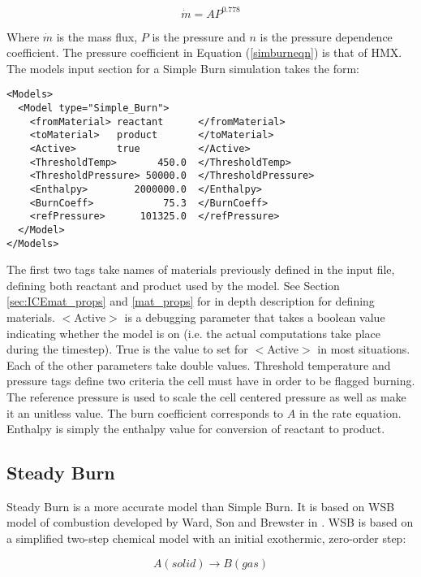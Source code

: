 \begin{equation}
\dot{m}=A P^{0.778}
\label{simburneqn}
\end{equation}

Where $\dot{m}$ is the mass flux, $P$ is the pressure and $n$ is the pressure dependence coefficient.  The pressure coefficient in Equation (\ref{simburneqn}) is that of HMX.  The models input section for a Simple Burn simulation takes the form: 

\begin{verbatim}
<Models>
  <Model type="Simple_Burn">
    <fromMaterial> reactant      </fromMaterial>
    <toMaterial>   product       </toMaterial>
    <Active>       true          </Active>
    <ThresholdTemp>       450.0  </ThresholdTemp>
    <ThresholdPressure> 50000.0  </ThresholdPressure>
    <Enthalpy>        2000000.0  </Enthalpy>
    <BurnCoeff>            75.3  </BurnCoeff>
    <refPressure>      101325.0  </refPressure>
  </Model>
</Models>
\end{verbatim}

The first two tags take names of materials previously defined in the input file, defining both reactant and product used by the model.  See Section \ref{sec:ICEmat_props} and \ref{mat_props} for in depth description for defining materials.  $<$Active$>$ is a debugging parameter that takes a boolean value indicating whether the model is on (i.e. the actual computations take place during the timestep).  True is the value to set for $<$Active$>$ in most situations.  Each of the other parameters take double values.  Threshold temperature and pressure tags define two criteria the cell must have in order to be flagged burning.  The reference pressure is used to scale the cell centered pressure as well as make it an unitless value.  The burn coefficient corresponds to $A$ in the rate equation.  Enthalpy is simply the enthalpy value for conversion of reactant to product.
\newpage
\subsection{Steady Burn} \label{Sec:SteadyBurn}

Steady Burn is a more accurate model than Simple Burn.  It is based on WSB model of combustion developed by Ward, Son and Brewster in \cite{ref:wardsonbrewster}.  WSB is based on a simplified two-step chemical model with an initial exothermic, zero-order step:

\begin{equation}
A(solid)\rightarrow B(gas)
\end{equation}

